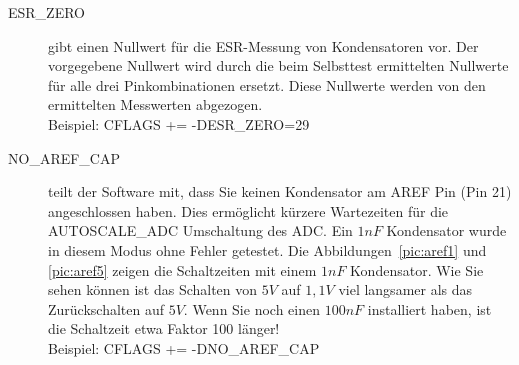 \begin{description}
  \item[ESR\_ZERO] gibt einen Nullwert für die ESR-Messung von Kondensatoren vor.
Der vorgegebene Nullwert wird durch die beim Selbsttest ermittelten Nullwerte für alle drei Pinkombinationen ersetzt.
 Diese Nullwerte werden von den ermittelten Messwerten abgezogen.\\
Beispiel: CFLAGS += -DESR\_ZERO=29

  \item[NO\_AREF\_CAP] teilt der Software mit, dass Sie keinen Kondensator am AREF Pin (Pin 21) angeschlossen haben.
Dies ermöglicht kürzere Wartezeiten für die AUTOSCALE\_ADC Umschaltung des ADC.
Ein \(1nF\) Kondensator wurde in diesem Modus ohne Fehler getestet.
Die Abbildungen~\ref{pic:aref1} und \ref{pic:aref5} zeigen die Schaltzeiten mit einem \(1nF\) Kondensator.
Wie Sie sehen können ist das Schalten von \(5V\) auf \(1,1V\) viel langsamer als das Zurückschalten auf \(5V\).
Wenn Sie noch einen \(100nF\) installiert haben, ist die Schaltzeit etwa Faktor 100 länger!\\
Beispiel: CFLAGS += -DNO\_AREF\_CAP

\end{description}

